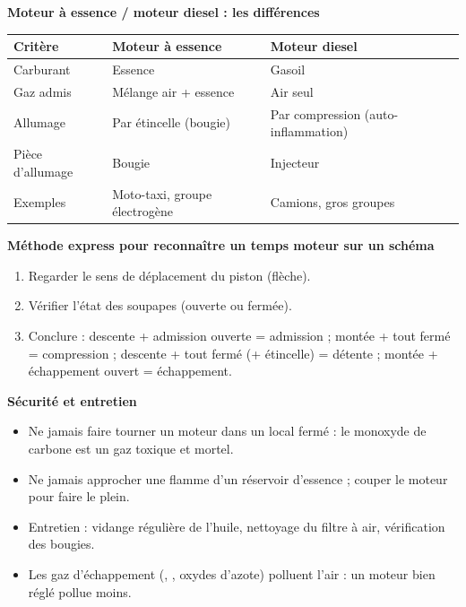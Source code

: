\documentclass[11pt]{article}
\newcommand{\cle}[1]{{\popxbold\color{popdark}#1}}
\begin{document}
\begin{bilan}
\textbf{Moteur à essence / moteur diesel : les différences}
\begin{center}
\begin{tabularx}{\linewidth}{|l|X|X|}
\hline
\rowcolor{popblueL} \textbf{Critère} & \textbf{Moteur à essence} & \textbf{Moteur diesel} \\
\hline
Carburant & Essence & Gasoil \\
\hline
Gaz admis & Mélange air + essence & Air seul \\
\hline
Allumage & Par étincelle (bougie) & Par compression (auto-inflammation) \\
\hline
Pièce d'allumage & Bougie & Injecteur \\
\hline
Exemples & Moto-taxi, groupe électrogène & Camions, gros groupes \\
\hline
\end{tabularx}
\end{center}

\textbf{Méthode express pour reconnaître un temps moteur sur un schéma}
\begin{enumerate}
\item Regarder le sens de déplacement du piston (flèche).
\item Vérifier l'état des soupapes (ouverte ou fermée).
\item Conclure : descente + admission ouverte = admission ; montée + tout fermé = compression ; descente + tout fermé (+ étincelle) = détente ; montée + échappement ouvert = échappement.
\end{enumerate}

\textbf{Sécurité et entretien}
\begin{itemize}
\item Ne jamais faire tourner un moteur dans un local fermé : le \cle{monoxyde de carbone}  est un gaz toxique et mortel.
\item Ne jamais approcher une flamme d'un réservoir d'essence ; couper le moteur pour faire le plein.
\item Entretien : vidange régulière de l'huile, nettoyage du filtre à air, vérification des bougies.
\item Les gaz d'échappement (, , oxydes d'azote) polluent l'air : un moteur bien réglé pollue moins.
\end{itemize}
\end{bilan}
\end{document}
